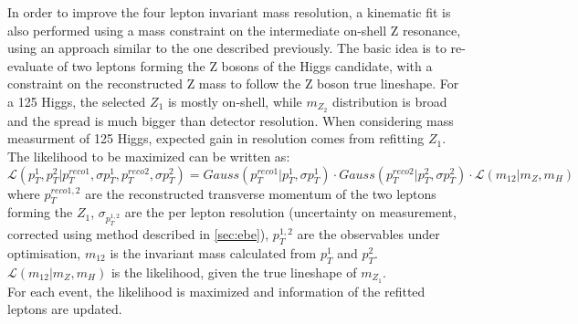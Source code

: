 In order to improve the four lepton invariant mass resolution, a kinematic fit is also performed
using a mass constraint on the intermediate on-shell Z resonance, using an approach similar to the one
described previously.
The basic idea is to re-evaluate \pT of two leptons forming 
the Z bosons of the Higgs candidate, with a constraint on the reconstructed Z mass to follow 
the Z boson true lineshape. For a 125 \GeV Higgs, the selected $Z_{1}$ is mostly on-shell, 
while $m_{Z_{2}}$ distribution is broad and the spread is much bigger than detector resolution. 
When considering mass measurment of 125 \GeV Higgs, expected gain in resolution comes from refitting $Z_{1}$.
The likelihood to be maximized can be written as:
\[
\mathcal{L}(p_{T}^{1} , p_{T}^{2}|p_{T}^{reco1}, \sigma p_{T}^{1},p_{T}^{reco2}, \sigma p_{T}^{2}) = 
Gauss(p_{T}^{reco1}|p_{T}^{1}, \sigma p_{T}^{1}) \cdot Gauss(p_{T}^{reco2}|p_{T}^{2}, \sigma p_{T}^{2}) 
\cdot \mathcal{L}(m_{12}|m_{Z},m_{H})
\]
where $p_{T}^{reco1,2}$ are the reconstructed transverse momentum of the two leptons forming the $Z_{1}$,
$\sigma_{p_{T}^{1,2}}$ are the per lepton resolution (uncertainty on \pT measurement, corrected using 
method described in \ref{sec:ebe}), $p_{T}^{1,2}$ are the observables under optimisation,
$m_{12}$ is the invariant mass calculated from $p_{T}^{1}$ and $p_{T}^{2}$. $\mathcal{L}(m_{12}|m_{Z},m_{H})$
is the likelihood, given the true lineshape of $m_{Z_{1}}$. \\
For each event, the likelihood is maximized and \pT information of the refitted leptons are updated. \\
